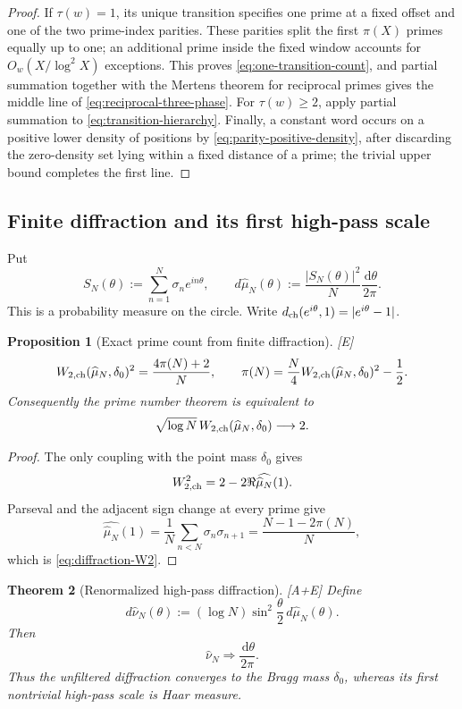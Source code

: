 \documentclass[11pt]{article}
\newtheorem{theorem}{Theorem}[section]
\newtheorem{proposition}[theorem]{Proposition}
\theoremstyle{definition}
\theoremstyle{remark}
\newcommand{\status}[1]{\textnormal{\textcolor{accent}{\footnotesize[#1]}}}
\newcommand{\dd}{\,\mathrm d}
\begin{document}
\begin{proof}
If $\tau(w)=1$, its unique transition specifies one prime at a fixed offset and one
of the two prime-index parities.  These parities split the first $\pi(X)$ primes equally
up to one; an additional prime inside the fixed window accounts for
$O_w(X/\log^2X)$ exceptions.  This proves \eqref{eq:one-transition-count}, and
partial summation together with the Mertens theorem for reciprocal primes gives the
middle line of \eqref{eq:reciprocal-three-phase}.  For $\tau(w)\ge2$, apply partial
summation to \eqref{eq:transition-hierarchy}.  Finally, a constant word occurs on a
positive lower density of positions by \eqref{eq:parity-positive-density}, after
discarding the zero-density set lying within a fixed distance of a prime; the trivial
upper bound completes the first line.
\end{proof}

\subsection{Finite diffraction and its first high-pass scale}

Put
\[
 S_N(\theta):=\sum_{n=1}^N\sigma_ne^{in\theta},
 \qquad
 d\widehat\mu_N(\theta):=
 \frac{|S_N(\theta)|^2}{N}\frac{\dd\theta}{2\pi}.
\]
This is a probability measure on the circle.  Write
$d_{\rm ch}(e^{i\theta},1)=|e^{i\theta}-1|$.

\begin{proposition}[Exact prime count from finite diffraction]
\label{prop:diffraction-prime-count}
\status{E}
\begin{equation}\label{eq:diffraction-W2}
 W_{2,{\rm ch}}(\widehat\mu_N,\delta_0)^2
 =\frac{4\pi(N)+2}{N},
 \qquad
 \pi(N)=\frac N4W_{2,{\rm ch}}(\widehat\mu_N,\delta_0)^2-\frac12.
\end{equation}
Consequently the prime number theorem is equivalent to
\[
 \sqrt{\log N}\,W_{2,{\rm ch}}(\widehat\mu_N,\delta_0)\longrightarrow2.
\]
\end{proposition}

\begin{proof}
The only coupling with the point mass $\delta_0$ gives
\[
 W_{2,{\rm ch}}^2=2-2\Re\widehat{\widehat\mu_N}(1).
\]
Parseval and the adjacent sign change at every prime give
\[
 \widehat{\widehat\mu_N}(1)
 =\frac1N\sum_{n<N}\sigma_n\sigma_{n+1}
 =\frac{N-1-2\pi(N)}N,
\]
which is \eqref{eq:diffraction-W2}.
\end{proof}

\begin{theorem}[Renormalized high-pass diffraction]\label{thm:white-high-pass}
\status{A+E}
Define
\[
 d\widehat\nu_N(\theta)
 :=(\log N)\sin^2\!\frac\theta2\,d\widehat\mu_N(\theta).
\]
Then
\begin{equation}\label{eq:white-high-pass}
 \widehat\nu_N\Longrightarrow\frac{\dd\theta}{2\pi}.
\end{equation}
Thus the unfiltered diffraction converges to the Bragg mass $\delta_0$, whereas its
first nontrivial high-pass scale is Haar measure.
\end{theorem}
\end{document}
